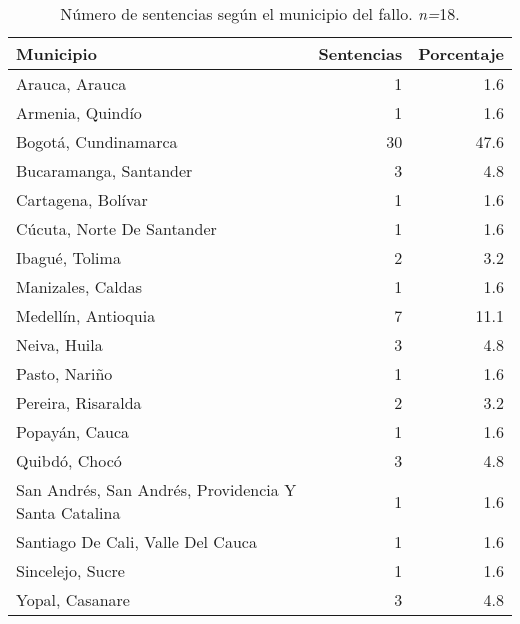\begin{table}[H]
\centering
\caption{Número de sentencias según el municipio del fallo. \textit{n=}18.} 
\label{tab:munfal}
\begin{tabular}{lrr}
  \hline
Municipio & Sentencias & Porcentaje \\ 
  \hline
Arauca, Arauca &  1 & 1.6 \\ 
  Armenia, Quindío &  1 & 1.6 \\ 
  Bogotá, Cundinamarca & 30 & 47.6 \\ 
  Bucaramanga, Santander &  3 & 4.8 \\ 
  Cartagena, Bolívar &  1 & 1.6 \\ 
  Cúcuta, Norte De Santander &  1 & 1.6 \\ 
  Ibagué, Tolima &  2 & 3.2 \\ 
  Manizales, Caldas &  1 & 1.6 \\ 
  Medellín, Antioquia &  7 & 11.1 \\ 
  Neiva, Huila &  3 & 4.8 \\ 
  Pasto, Nariño &  1 & 1.6 \\ 
  Pereira, Risaralda &  2 & 3.2 \\ 
  Popayán, Cauca &  1 & 1.6 \\ 
  Quibdó, Chocó &  3 & 4.8 \\ 
  San Andrés, San Andrés, Providencia Y Santa Catalina &  1 & 1.6 \\ 
  Santiago De Cali, Valle Del Cauca &  1 & 1.6 \\ 
  Sincelejo, Sucre &  1 & 1.6 \\ 
  Yopal, Casanare &  3 & 4.8 \\ 
   \hline
\end{tabular}
\end{table}
